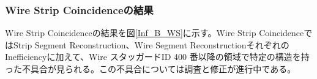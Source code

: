 
\subsubsection*{Wire Strip Coincidenceの結果}
Wire Strip Coincidenceの結果を図\ref{Inf_B_WS}に示す。Wire Strip CoincidenceではStrip Segment Reconstruction、Wire Segment ReconstructionそれぞれのInefficiencyに加えて、Wire スタッガードID 400 番以降の領域で特定の構造を持った不具合が見られる。この不具合については調査と修正が進行中である。

